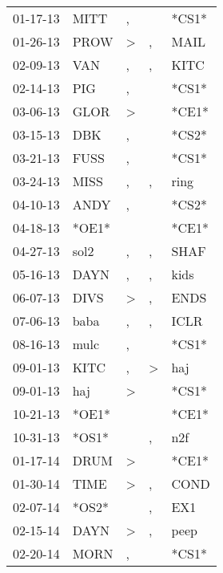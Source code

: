 \begin{supertabular}{lllll}
 01-17-13 &   MITT &                , &                  &  *CS1* \\
 01-26-13 &   PROW &     \textgreater &                , &   MAIL \\
 02-09-13 &    VAN &                , &                , &   KITC \\
 02-14-13 &    PIG &                , &                  &  *CS1* \\
 03-06-13 &   GLOR &     \textgreater &                  &  *CE1* \\
 03-15-13 &    DBK &                , &                  &  *CS2* \\
 03-21-13 &   FUSS &                , &                  &  *CS1* \\
 03-24-13 &   MISS &                , &                , &   ring \\
 04-10-13 &   ANDY &                , &                  &  *CS2* \\
 04-18-13 &  *OE1* &                  &                  &  *CE1* \\
 04-27-13 &   sol2 &                , &                , &   SHAF \\
 05-16-13 &   DAYN &                , &                , &   kids \\
 06-07-13 &   DIVS &     \textgreater &                , &   ENDS \\
 07-06-13 &   baba &                , &                , &   ICLR \\
 08-16-13 &   mulc &                , &                  &  *CS1* \\
 09-01-13 &   KITC &                , &     \textgreater &    haj \\
 09-01-13 &    haj &     \textgreater &                  &  *CS1* \\
 10-21-13 &  *OE1* &                  &                  &  *CE1* \\
 10-31-13 &  *OS1* &                  &                , &    n2f \\
 01-17-14 &   DRUM &     \textgreater &                  &  *CE1* \\
 01-30-14 &   TIME &     \textgreater &                , &   COND \\
 02-07-14 &  *OS2* &                  &                , &    EX1 \\
 02-15-14 &   DAYN &     \textgreater &                , &   peep \\
 02-20-14 &   MORN &                , &                  &  *CS1* \\

\end{supertabular}
